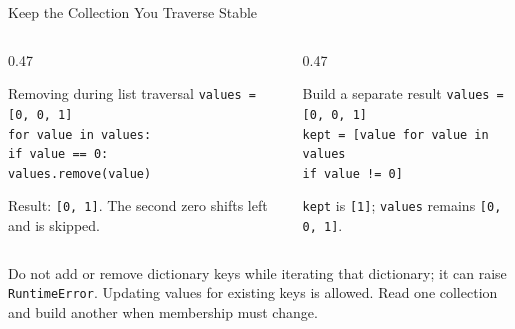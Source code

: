 \documentclass[aspectratio=169,10pt]{beamer}
\begin{document}
\begin{frame}{Keep the Collection You Traverse Stable}
  \small
  \begin{columns}[T,onlytextwidth]
    \begin{column}{0.47\textwidth}
      \begin{alertblock}{Removing during list traversal}
        \texttt{values = [0, 0, 1]}\\
        \texttt{for value in values:}\\
        \hspace{0.18in}\texttt{if value == 0:}\\
        \hspace{0.36in}\texttt{values.remove(value)}
      \end{alertblock}
      Result: \texttt{[0, 1]}. The second zero shifts left and is skipped.
    \end{column}
    \begin{column}{0.47\textwidth}
      \begin{block}{Build a separate result}
        \texttt{values = [0, 0, 1]}\\
        \texttt{kept = [value for value in values}\\
        \hspace{0.60in}\texttt{if value != 0]}
      \end{block}
      \texttt{kept} is \texttt{[1]}; \texttt{values} remains \texttt{[0, 0, 1]}.
    \end{column}
  \end{columns}
  \begin{keyidea}
    Do not add or remove dictionary keys while iterating that dictionary; it can raise \texttt{RuntimeError}. Updating values for existing keys is allowed. Read one collection and build another when membership must change.
  \end{keyidea}
\end{frame}
\end{document}
